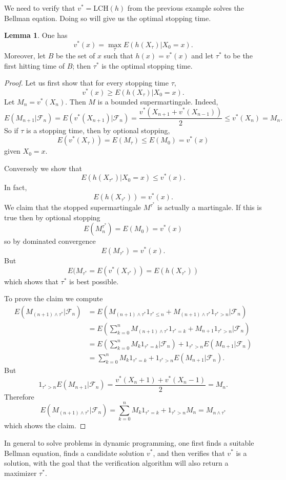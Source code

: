\documentclass[12pt]{book}
\theoremstyle{definition}
\newtheorem{lemma}[theorem]{Lemma}
\begin{document}
We need to verify that $v^* = \text{LCH}(h)$ from the previous example solves the Bellman eqation.
Doing so will give us the optimal stopping time.
\begin{lemma}
One has
$$v^*(x) = \max_\tau E(h(X_\tau)|X_0 = x).$$
Moreover, let $B$ be the set of $x$ such that $h(x) = v^*(x)$ and let $\tau^*$ to be the first hitting time of $B$; then $\tau^*$ is the optimal stopping time.
\end{lemma}
\begin{proof}
Let us first show that for every stopping time $\tau$,
$$v^*(x) \geq E(h(X_\tau)|X_0 = x).$$
Let $M_n = v^*(X_n)$.
Then $M$ is a bounded supermartingale. Indeed,
$$E(M_{n+1}|\mathcal F_n) = E(v^*(X_{n+1})|\mathcal F_n) = \frac{v^*(X_{n+1} + v^*(X_{n-1}))}{2} \leq v^*(X_n) = M_n.$$
So if $\tau$ is a stopping time, then by optional stopping,
$$E(v^*(X_\tau)) = E(M_\tau) \leq E(M_0) = v^*(x)$$
given $X_0 = x$.

Conversely we show that
$$E(h(X_{\tau^*})|X_0 = x) \leq v^*(x).$$
In fact,
$$E(h(X_{\tau^*})) = v^*(x).$$
We claim that the stopped supermartingale $M^{\tau^*}$ is actually a martingale.
If this is true then by optional stopping
$$E(M^{\tau^*}_n) = E(M_0) = v^*(x)$$
so by dominated convergence
$$E(M_{\tau^*}) = v^*(x).$$
But
$$E(M_{\tau^*} = E(v^*(X_{\tau^*})) = E(h(X_{\tau^*}))$$
which shows that $\tau^*$ is best possible.

To prove the claim we compute
\begin{align*}E(M_{(n+1) \wedge \tau^*}|\mathcal F_n) &= E(M_{(n+1) \wedge \tau^*}1_{\tau^* \leq n} + M_{(n+1) \wedge \tau^*}1_{\tau^* > n}|\mathcal F_n)\\
&= E\left(\sum_{k = 0}^n M_{(n+1) \wedge \tau^*} 1_{\tau^* = k} + M_{n+1} 1_{\tau^* > n}\bigg|\mathcal F_n\right)\\
&= E\left(\sum_{k = 0}^n M_k 1_{\tau^* = k}\bigg|\mathcal F_n\right) + 1_{\tau^* > n} E(M_{n+1}|\mathcal F_n)\\
&= \sum_{k = 0}^n M_k 1_{\tau^* = k} + 1_{\tau^* > n} E(M_{n+1}|\mathcal F_n).
\end{align*}
But
$$1_{\tau^* > n} E(M_{n+1}|\mathcal F_n) = \frac{v^*(X_n + 1) + v^*(X_n - 1)}{2} = M_n.$$
Therefore
$$E(M_{(n+1) \wedge \tau^*}|\mathcal F_n) = \sum_{k=0}^n M_k 1_{\tau^* = k} + 1_{\tau^* > n}M_n = M_{n \wedge \tau^*}$$
which shows the claim.
\end{proof}

In general to solve problems in dynamic programming, one first finds a suitable Bellman equation, finds a candidate solution $v^*$, and then verifies that $v^*$ is a solution, with the goal that the verification algorithm will also return a maximizer $\tau^*$.
\end{document}
